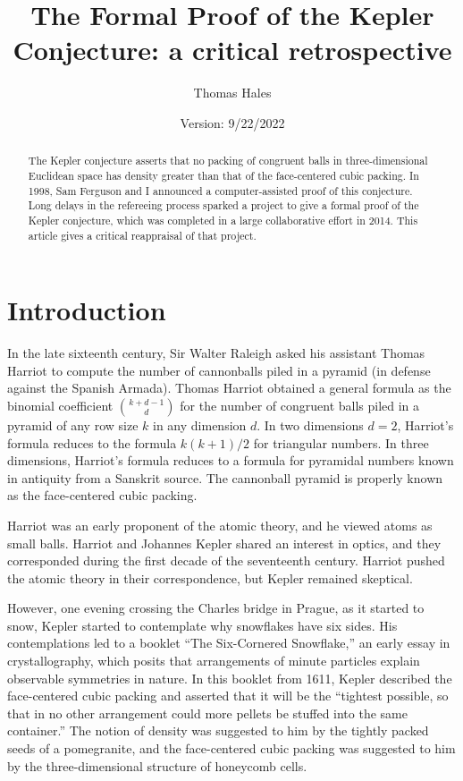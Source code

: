 \documentclass{amsart}
\title{The Formal Proof of the Kepler Conjecture: a critical retrospective}
\author{Thomas Hales}
\date{}
\date{Version: 9/22/2022}
\begin{document}
\maketitle

\begin{abstract} 
  The Kepler conjecture asserts that no packing of congruent balls in
  three-dimensional Euclidean space has density greater than that of the
  face-centered cubic packing.  In 1998, Sam Ferguson and I
  announced a computer-assisted proof of this conjecture.  Long delays
  in the refereeing process sparked a project to give a formal proof
  of the Kepler conjecture, which was completed in a large
  collaborative effort in 2014.  This article gives a critical
  reappraisal of that project.
\end{abstract}

\baselineskip
{}\baselineskip

\newenvironment{blockquote}{%
  \par%
  \medskip%
  \baselineskip=0.7\baselineskip%
  \leftskip=2em\rightskip=2em%
  \noindent\ignorespaces}{%
  \par\medskip}

\section{Introduction}

In the late sixteenth century, Sir Walter Raleigh asked his assistant
Thomas Harriot to compute the number of cannonballs piled in a pyramid
(in defense against the Spanish Armada).  Thomas Harriot obtained a
general formula as the binomial coefficient ${k+d-1\choose d}$ for the
number of congruent balls piled in a pyramid of any row size $k$ in
any dimension $d$.  In two dimensions $d=2$, Harriot's formula reduces
to the formula $k(k+1)/2$ for triangular numbers.  In three
dimensions, Harriot's formula reduces to a formula for pyramidal
numbers known in antiquity from a Sanskrit source.  The cannonball
pyramid is properly known as the face-centered cubic packing.

Harriot was an early proponent of the atomic theory, and he viewed
atoms as small balls.  Harriot and Johannes Kepler shared an interest in
optics, and they corresponded during the first decade of the
seventeenth century.  Harriot pushed the atomic theory in their
correspondence, but Kepler remained skeptical.

However, one evening crossing the Charles bridge in Prague, as it
started to snow, Kepler started to contemplate why snowflakes have six
sides.  His contemplations led to a booklet ``The Six-Cornered
Snowflake,'' an early essay in crystallography, which posits that
arrangements of minute particles explain observable symmetries in
nature.  In this booklet from 1611, Kepler described the face-centered
cubic packing and asserted that it will be the ``tightest possible, so
that in no other arrangement could more pellets be stuffed into the
same container.'' The notion of density was suggested to him by the
tightly packed seeds of a pomegranite, and the face-centered cubic
packing was suggested to him by the three-dimensional structure of
honeycomb cells.
\end{document}
